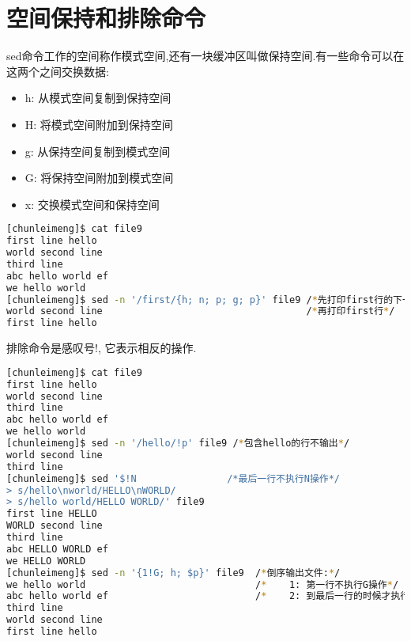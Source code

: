 \documentclass{article}
\begin{document}
\section{空间保持和排除命令}
sed命令工作的空间称作模式空间,还有一块缓冲区叫做保持空间.有一些命令可以在这两个之间交换数据: \par
\begin{itemize}
	\item h: 从模式空间复制到保持空间
	\item H: 将模式空间附加到保持空间
	\item g: 从保持空间复制到模式空间
	\item G: 将保持空间附加到模式空间
	\item x: 交换模式空间和保持空间
\end{itemize}
\begin{lstlisting}[language=bash, caption={Hold Space}]
[chunleimeng]$ cat file9
first line hello
world second line
third line
abc hello world ef
we hello world
[chunleimeng]$ sed -n '/first/{h; n; p; g; p}' file9 /*先打印first行的下一行*/
world second line                                    /*再打印first行*/
first line hello
\end{lstlisting}
排除命令是感叹号!, 它表示相反的操作. \par
\begin{lstlisting}[language=bash, caption={Negate}]
[chunleimeng]$ cat file9
first line hello
world second line
third line
abc hello world ef
we hello world
[chunleimeng]$ sed -n '/hello/!p' file9 /*包含hello的行不输出*/
world second line
third line
[chunleimeng]$ sed '$!N                /*最后一行不执行N操作*/
> s/hello\nworld/HELLO\nWORLD/
> s/hello world/HELLO WORLD/' file9
first line HELLO
WORLD second line
third line
abc HELLO WORLD ef
we HELLO WORLD
[chunleimeng]$ sed -n '{1!G; h; $p}' file9  /*倒序输出文件:*/
we hello world                              /*    1: 第一行不执行G操作*/
abc hello world ef                          /*    2: 到最后一行的时候才执行p操作*/
third line
world second line
first line hello

\end{lstlisting}
\end{document}
